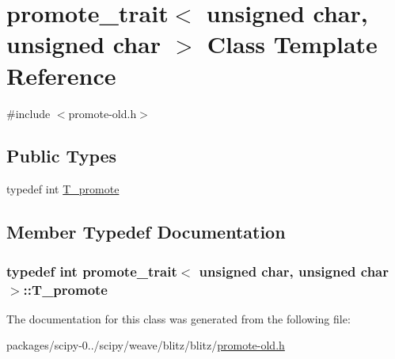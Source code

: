 \hypertarget{classpromote__trait_3_01unsigned_01char_00_01unsigned_01char_01_4}{}\section{promote\+\_\+trait$<$ unsigned char, unsigned char $>$ Class Template Reference}
\label{classpromote__trait_3_01unsigned_01char_00_01unsigned_01char_01_4}


{\ttfamily \#include $<$promote-\/old.\+h$>$}

\subsection*{Public Types}
\begin{DoxyCompactItemize}
\item 
typedef int \hyperlink{classpromote__trait_3_01unsigned_01char_00_01unsigned_01char_01_4_af3d52fd8248c41e00b918a9d0178798a}{T\+\_\+promote}
\end{DoxyCompactItemize}


\subsection{Member Typedef Documentation}
\hypertarget{classpromote__trait_3_01unsigned_01char_00_01unsigned_01char_01_4_af3d52fd8248c41e00b918a9d0178798a}{}
\subsubsection[{T\+\_\+promote}]{\setlength{\rightskip}{0pt plus 5cm}typedef int {\bf promote\+\_\+trait}$<$ unsigned char, unsigned char $>$\+::{\bf T\+\_\+promote}}\label{classpromote__trait_3_01unsigned_01char_00_01unsigned_01char_01_4_af3d52fd8248c41e00b918a9d0178798a}


The documentation for this class was generated from the following file\+:\begin{DoxyCompactItemize}
\item 
packages/scipy-\/0../scipy/weave/blitz/blitz/\hyperlink{promote-old_8h}{promote-\/old.\+h}\end{DoxyCompactItemize}
